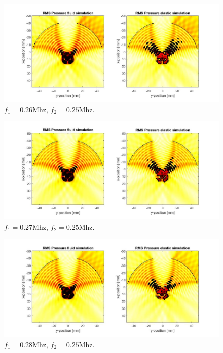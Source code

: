 \documentclass[10pt,a4paper]{article}
\begin{document}
\begin{figure}[H]
\hspace*{-4cm}                                                    
\includegraphics[scale=0.6]{comp_260kHz}
\caption{$f_1  = 0.26$Mhz, $f_2 = 0.25$Mhz.}
\label{comp_260kHz}
\end{figure}
\begin{figure}[H]
\hspace*{-4cm}                                                    
\includegraphics[scale=0.6]{comp_270kHz}
\caption{$f_1  = 0.27$Mhz, $f_2 = 0.25$Mhz.}
\label{comp_270kHz}
\end{figure}
\begin{figure}[H]
\hspace*{-4cm}                                                    
\includegraphics[scale=0.6]{comp_280kHz}
\caption{$f_1  = 0.28$Mhz, $f_2 = 0.25$Mhz.}
\label{comp_280kHz}
\end{figure}
\end{document}
